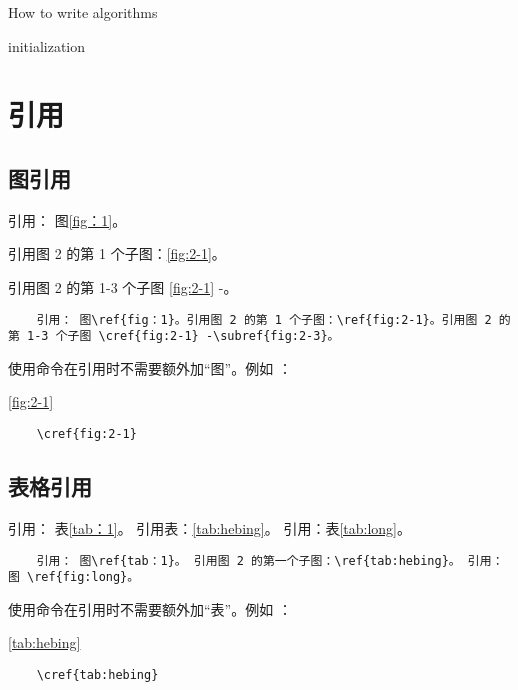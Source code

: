 \begin{algorithm}[H]
	\caption{How to write algorithms}\label{algorithm3.1}
	initialization\;
\end{algorithm}

\section{引用}
\subsection{图引用}
引用： 图\ref{fig：1}。

引用图 2 的第 1 个子图：\ref{fig:2-1}。

引用图 2 的第 1-3 个子图 \cref{fig:2-1} -。

\begin{lstlisting}
	引用： 图\ref{fig：1}。引用图 2 的第 1 个子图：\ref{fig:2-1}。引用图 2 的第 1-3 个子图 \cref{fig:2-1} -\subref{fig:2-3}。
\end{lstlisting}
使用\myverb{\cref{}}命令在引用时不需要额外加“图”。例如 ：

\cref{fig:2-1}

\begin{lstlisting}
	\cref{fig:2-1}
\end{lstlisting}
\subsection{表格引用}
引用： 表\ref{tab：1}。 引用表：\ref{tab:hebing}。 引用：表\ref{tab:long}。
\begin{lstlisting}
	引用： 图\ref{tab：1}。 引用图 2 的第一个子图：\ref{tab:hebing}。 引用： 图 \ref{fig:long}。
\end{lstlisting}

使用\myverb{\cref{}}命令在引用时不需要额外加“表”。例如 ：

\cref{tab:hebing}

\begin{lstlisting}
	\cref{tab:hebing}
\end{lstlisting}


